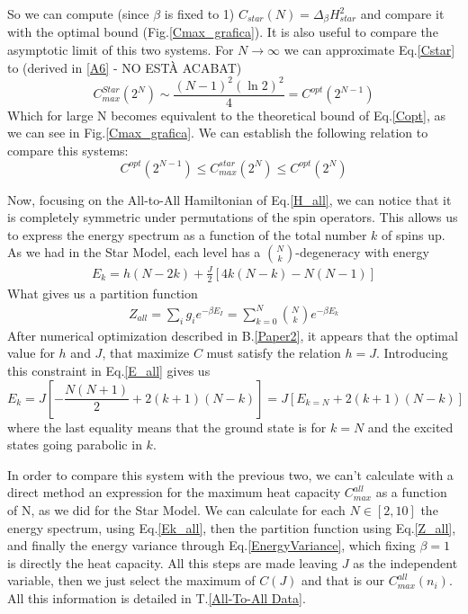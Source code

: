 \documentclass{article}
\begin{document}
So we can compute (since $\beta$ is fixed to 1) $C_{star}(N)= \Delta_\beta H_{star}^2$ and compare it with the optimal bound (Fig.\ref{Cmax_grafica}). It is also useful to compare the asymptotic limit of this two systems. For $N\to \infty$ we can approximate Eq.\eqref{Cstar} to (derived in \ref{A6} - NO ESTÀ ACABAT)
\begin{equation}
    C_{max}^{Star}(2^N) \sim \frac{(N-1)^2(\ln{2})^2}{4} = C^{opt}(2^{N-1})
\end{equation}
Which for large N becomes equivalent to the theoretical bound of Eq.\eqref{Copt}, as we can see in Fig.\ref{Cmax_grafica}. We can establish the following relation to compare this systems:
\begin{equation}
    C^{opt}(2^{N-1})\leq C^{star}_{max}(2^N)\leq C^{opt}(2^{N})
\end{equation}
\par
Now, focusing on the All-to-All Hamiltonian of Eq.\eqref{H_all}, we can notice that it is completely symmetric under permutations of the spin operators. This allows us to express the energy spectrum as a function of the total number $k$ of spins up. As we had in the Star Model, each level has a $\binom{N}{k}$-degeneracy with energy
\begin{align}
    E_k=h(N-2k)+\frac{J}{2}[4k(N-k)-N(N-1)]
    \label{E_all}
\end{align}
What gives us a partition function
\begin{align}
    Z_{all}=\sum_ig_ie^{-\beta E_I}=\sum_{k=0}^N\binom{N}{k}e^{-\beta E_k}
    \label{Z_all}
\end{align}
After numerical optimization described in B.\ref{Paper2}, it appears that the optimal value for $h$ and $J$, that maximize $C$ must satisfy the relation $h=J$. Introducing this constraint in Eq.\eqref{E_all} gives us
\begin{equation}
    E_k=J\left[-\frac{N(N+1)}{2}+2(k+1)(N-k)\right] =J\left[ E_{k=N}+2(k+1)(N-k)\right]
    \label{Ek_all}
\end{equation}
where the last equality means that the ground state is for $k=N$ and the excited states going parabolic in $k$.\par
In order to compare this system with the previous two, we can't calculate with a direct method an expression for the maximum heat capacity $C_{max}^{all}$ as a function of N, as we did for the Star Model. We can calculate for each $N\in[2,10]$ the energy spectrum, using Eq.\eqref{Ek_all}, then the partition function using Eq.\eqref{Z_all}, and finally the energy variance through Eq.\eqref{EnergyVariance}, which fixing $\beta = 1$ is directly the heat capacity. All this steps are made leaving $J$ as the independent variable, then we just select the maximum of $C(J)$ and that is our $C^{all}_{max}(n_i)$. All this information is detailed in T.\ref{All-To-All Data}. \par
\end{document}
